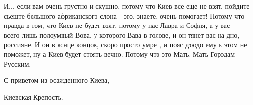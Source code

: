 И... если вам очень грустно и скушно, потому что Киев все еще не взят, пойдите
сьеште большого африканского слона - это, знаете, очень помогает! Потому что
правда в том, что Киев не будет взят, потому у нас Лавра и София, а у вас -
всего лишь полоумный Вова,  у которого Вава в голове,  и он тянет вас на дно,
россияне. И он в конце концов, скоро просто умрет, и пояс дзюдо ему в этом не
поможет, ну а Киев будет стоять вечно. Потому что это Мать, Мать Городам
Русским.

С приветом из осажденного Киева,

Киевская Крепость.


